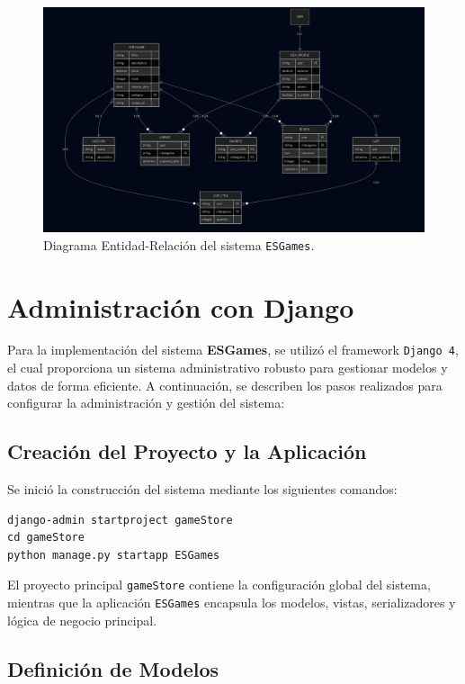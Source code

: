\documentclass{article}
\begin{document}
\begin{figure}[H]
    \centering
    \includegraphics[width=0.9\linewidth]{img/datos2.png}
    \caption{Diagrama Entidad-Relación del sistema \texttt{ESGames}.}
\end{figure}

	

\section{Administración con Django}

Para la implementación del sistema \textbf{ESGames}, se utilizó el framework \texttt{Django 4}, el cual proporciona un sistema administrativo robusto para gestionar modelos y datos de forma eficiente. A continuación, se describen los pasos realizados para configurar la administración y gestión del sistema:

\subsection{Creación del Proyecto y la Aplicación}

Se inició la construcción del sistema mediante los siguientes comandos:

\begin{verbatim}
django-admin startproject gameStore
cd gameStore
python manage.py startapp ESGames
\end{verbatim}

El proyecto principal \texttt{gameStore} contiene la configuración global del sistema, mientras que la aplicación \texttt{ESGames} encapsula los modelos, vistas, serializadores y lógica de negocio principal.

\subsection{Definición de Modelos}
\end{document}
